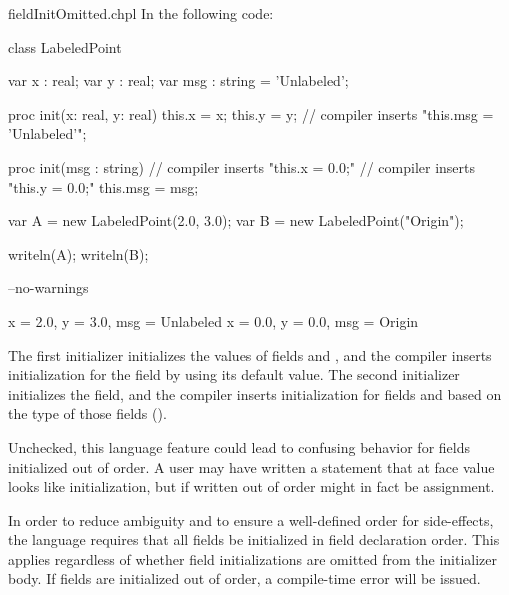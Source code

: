 \begin{chapelexample}{fieldInitOmitted.chpl}
In the following code:
\begin{chapel}
class LabeledPoint {
  var x : real;
  var y : real;
  var msg : string = 'Unlabeled';

  proc init(x: real, y: real) {
    this.x = x;
    this.y = y;
    // compiler inserts "this.msg = 'Unlabeled'";
  }

  proc init(msg : string) {
    // compiler inserts "this.x = 0.0;"
    // compiler inserts "this.y = 0.0;"
    this.msg = msg;
  }
}

var A = new LabeledPoint(2.0, 3.0);
var B = new LabeledPoint("Origin");
\end{chapel}
\begin{chapelpost}
writeln(A);
writeln(B);
\end{chapelpost}
\begin{chapelcompopts}
--no-warnings
\end{chapelcompopts}
\begin{chapeloutput}
{x = 2.0, y = 3.0, msg = Unlabeled}
{x = 0.0, y = 0.0, msg = Origin}
\end{chapeloutput}
The first initializer initializes the values of fields  and ,
and the compiler inserts initialization for the  field by using
its default value. The second initializer initializes the  field,
and the compiler inserts initialization for fields  and 
based on the type of those fields ().
\end{chapelexample}

Unchecked, this language feature could lead to confusing behavior for fields
initialized out of order. A user may have written a statement that at face
value looks like initialization, but if written out of order might in fact be
assignment.

In order to reduce ambiguity and to ensure a well-defined order for
side-effects, the language requires that all fields be initialized in field
declaration order. This applies regardless of whether field initializations
are omitted from the initializer body. If fields are initialized out of order,
a compile-time error will be issued.

